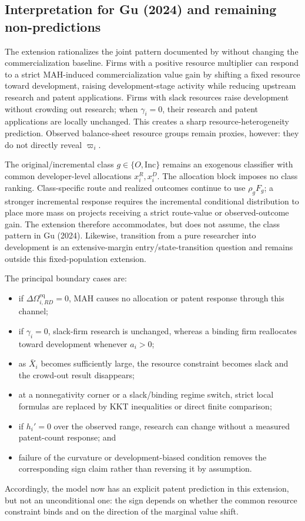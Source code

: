 \subsection{Interpretation for Gu (2024) and remaining non-predictions}
\label{subsec:erd-gu-mapping}

The extension rationalizes the joint pattern documented by \citet{Gu2024}
without changing the commercialization baseline. Firms with a positive
resource multiplier can respond to a strict MAH-induced commercialization
value gain by shifting a fixed resource toward development, raising
development-stage activity while reducing upstream research and patent
applications. Firms with slack resources raise development without crowding
out research; when \(\gamma_i=0\), their research and patent applications are
locally unchanged. This creates a sharp resource-heterogeneity prediction.
Observed balance-sheet resource groups remain proxies, however: they do not
directly reveal \(\varpi_i\).

The original/incremental class \(g\in\{O,\mathrm{Inc}\}\) remains an exogenous
classifier with common developer-level allocations \(x_i^R,x_i^D\). The
allocation block imposes no class ranking. Class-specific route and realized
outcomes continue to use \(\rho_gF_g\); a stronger incremental response
requires the incremental conditional distribution to place more mass on
projects receiving a strict route-value or observed-outcome gain. The
extension therefore accommodates, but does not assume, the class pattern in
Gu (2024). Likewise, transition from a pure researcher into development is
an extensive-margin entry/state-transition question and remains outside this
fixed-population extension.

The principal boundary cases are:

\begin{itemize}
  \item if \(\Delta\Omega_{i,RD}^{\mathrm{eq}}=0\), MAH causes no allocation
  or patent response through this channel;
  \item if \(\gamma_i=0\), slack-firm research is unchanged, whereas a
  binding firm reallocates toward development whenever \(a_i>0\);
  \item as \(\bar X_i\) becomes sufficiently large, the resource constraint
  becomes slack and the crowd-out result disappears;
  \item at a nonnegativity corner or a slack/binding regime switch, strict
  local formulas are replaced by KKT inequalities or direct finite
  comparison;
  \item if \(h_i'=0\) over the observed range, research can change without a
  measured patent-count response; and
  \item failure of the curvature or development-biased condition removes the
  corresponding sign claim rather than reversing it by assumption.
\end{itemize}

Accordingly, the model now has an explicit patent prediction in this
extension, but not an unconditional one: the sign depends on whether the
common resource constraint binds and on the direction of the marginal value
shift.
